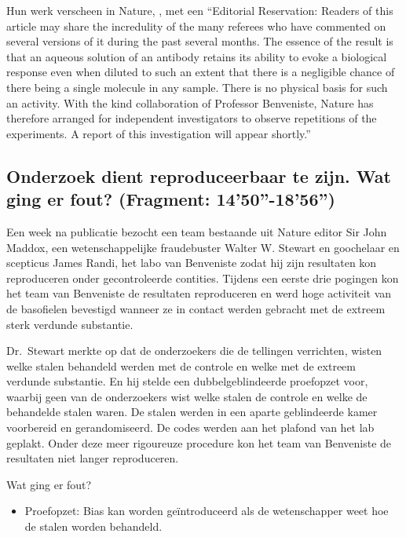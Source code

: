 \documentclass[12pt,dutch,coursenotes]{book}
\providecommand{\tightlist}{%
  \setlength{\itemsep}{0pt}\setlength{\parskip}{0pt}}
\theoremstyle{definition}
\theoremstyle{definition}
\theoremstyle{definition}
\theoremstyle{remark}
\begin{document}
Hun werk verscheen in Nature, \citet{benveniste1988}, met een
``Editorial Reservation: Readers of this article may share the
incredulity of the many referees who have commented on several versions
of it during the past several months. The essence of the result is that
an aqueous solution of an antibody retains its ability to evoke a
biological response even when diluted to such an extent that there is a
negligible chance of there being a single molecule in any sample. There
is no physical basis for such an activity. With the kind collaboration
of Professor Benveniste, Nature has therefore arranged for independent
investigators to observe repetitions of the experiments. A report of
this investigation will appear shortly.''

\subsection{Onderzoek dient reproduceerbaar te zijn. Wat ging er fout?
(Fragment:
14'50''-18'56'')}\label{onderzoek-dient-reproduceerbaar-te-zijn.-wat-ging-er-fout-fragment-1450-1856}

Een week na publicatie bezocht een team bestaande uit Nature editor Sir
John Maddox, een wetenschappelijke fraudebuster Walter W. Stewart en
goochelaar en scepticus James Randi, het labo van Benveniste zodat hij
zijn resultaten kon reproduceren onder gecontroleerde contities. Tijdens
een eerste drie pogingen kon het team van Benveniste de resultaten
reproduceren en werd hoge activiteit van de basofielen bevestigd wanneer
ze in contact werden gebracht met de extreem sterk verdunde substantie.

Dr.~Stewart merkte op dat de onderzoekers die de tellingen verrichten,
wisten welke stalen behandeld werden met de controle en welke met de
extreem verdunde substantie. En hij stelde een dubbelgeblindeerde
proefopzet voor, waarbij geen van de onderzoekers wist welke stalen de
controle en welke de behandelde stalen waren. De stalen werden in een
aparte geblindeerde kamer voorbereid en gerandomiseerd. De codes werden
aan het plafond van het lab geplakt. Onder deze meer rigoureuze
procedure kon het team van Benveniste de resultaten niet langer
reproduceren.

Wat ging er fout?

\begin{itemize}
\tightlist
\item
  Proefopzet: Bias kan worden geïntroduceerd als de wetenschapper weet
  hoe de stalen worden behandeld.
\end{itemize}
\end{document}
